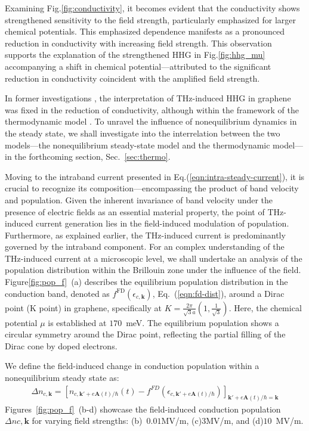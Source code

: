 Examining Fig.\ref{fig:conductivity}, it becomes evident that the conductivity shows strengthened sensitivity to the field strength, particularly emphasized for larger chemical potentials. This emphasized dependence manifests as a pronounced reduction in conductivity with increasing field strength. This observation supports the explanation of the strengthened HHG in Fig.\ref{fig:hhg_mu} accompanying a shift in chemical potential—attributed to the significant reduction in conductivity coincident with the amplified field strength.

In former investigations \cite{hafez2018extremely,kovalev2021electrical}, the interpretation of THz-induced HHG in graphene was fixed in the reduction of conductivity, although within the framework of the thermodynamic model \cite{mics2015thermodynamic}. To unravel the influence of nonequilibrium dynamics in the steady state, we shall investigate into the interrelation between the two models—the nonequilibrium steady-state model and the thermodynamic model—in the forthcoming section, Sec.~\ref{sec:thermo}.

Moving to the intraband current presented in Eq.(\ref{eqn:intra-steady-current}), it is crucial to recognize its composition—encompassing the product of band velocity and population. Given the inherent invariance of band velocity under the presence of electric fields as an essential material property, the point of THz-induced current generation lies in the field-induced modulation of population. Furthermore, as explained earlier, the THz-induced current is predominantly governed by the intraband component. For an complex understanding of the THz-induced current at a microscopic level, we shall undertake an analysis of the population distribution within the Brillouin zone under the influence of the field. Figure\ref{fig:pop_f}~(a) describes the equilibrium population distribution in the conduction band, denoted as $f^{\mathrm{FD}}(\epsilon_{c,\mathbf k})$, Eq.~(\ref{eqn:fd-dist}), around a Dirac point (K point) in graphene, specifically at $K =\frac{2\pi}{\sqrt{3}a}\left(1, \frac{1}{\sqrt{3}}\right)$. Here, the chemical potential $\mu$ is established at $170$~meV. The equilibrium population shows a circular symmetry around the Dirac point, reflecting the partial filling of the Dirac cone by doped electrons.

We define the field-induced change in conduction population within a nonequilibrium steady
state as:
\begin{align}
	\Delta n_{c,\mathbf{k}}= \left [n_{c, \mathbf{k}'+e\mathbf{A}(t)/\hbar}(t)- f^{FD}(\epsilon_{c,\mathbf{k}'+e\mathbf A (t)/\hbar})\right ]_{\mathbf k'+e\mathbf A(t)/\hbar =\mathbf k}
\end{align}
Figures~\ref{fig:pop_f}~(b-d) showcase the field-induced conduction population $\Delta n{c,\mathbf{k}}$ for varying field strengths: (b)~$0.01$MV/m, (c)$3$MV/m, and (d)$10$~MV/m.

